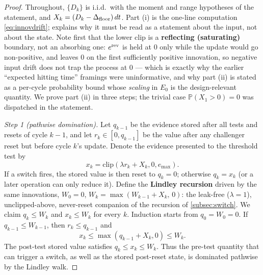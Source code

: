 \begin{proof}
Throughout, $\{D_k\}$ is i.i.d.\ with the moment and range hypotheses of the statement, and $X_k = (D_k - \Delta_{\text{floor}})\,dt$. Part (i) is the one-line computation \eqref{eq:innovdrift};  explains why it must be read as a statement about the input, not about the state. Note first that the lower clip is a \textbf{reflecting (saturating)} boundary, not an absorbing one: $e^{\text{rev}}$ is held at $0$ only while the update would go non-positive, and leaves $0$ on the first sufficiently positive innovation, so negative input drift does not trap the process at $0$ --- which is exactly why the earlier ``expected hitting time'' framings were uninformative, and why part (ii) is stated as a per-cycle probability bound whose \emph{scaling} in $E_0$ is the design-relevant quantity. We prove part (ii) in three steps; the trivial case $\mathbb{P}(X_1 > 0) = 0$ was dispatched in the statement.

\emph{Step 1 (pathwise domination).} Let $q_{k-1}$ be the evidence stored after all tests and resets of cycle $k-1$, and let $r_k\in[0,q_{k-1}]$ be the value after any challenger reset but before cycle $k$'s update. Denote the evidence presented to the threshold test by
\[
x_k=\mathrm{clip}(\lambda r_k+X_k,0,e_{\max}).
\]
If a switch fires, the stored value is then reset to $q_k=0$; otherwise $q_k=x_k$ (or a later operation can only reduce it). Define the \textbf{Lindley recursion} \citep{lindley1952queue} driven by the same innovations, $W_0 = 0$, $W_k = \max(W_{k-1} + X_k,\, 0)$: the leak-free ($\lambda = 1$), unclipped-above, never-reset companion of the recursion of \cref{subsec:switch}. We claim $q_k \le W_k$ and $x_k\le W_k$ for every $k$. Induction starts from $q_0=W_0=0$. If $q_{k-1}\le W_{k-1}$, then $r_k\le q_{k-1}$ and
\[
 x_k \le \max(q_{k-1}+X_k,0)\le W_k.
\]
The post-test stored value satisfies $q_k\le x_k\le W_k$. Thus the pre-test quantity that can trigger a switch, as well as the stored post-reset state, is dominated pathwise by the Lindley walk.


\end{proof}
